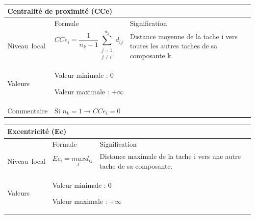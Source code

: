 \documentclass{article}
\begin{document}
\begin{table}[H]
\raggedright
\begin{tabular}{|m{3.24cm}|m{4.4810004cm}m{7.924cm}|}

\hline
\multicolumn{3}{|m{16.044998cm}|}{Centralité de proximité (CCe)}\\\hline
 &
\multicolumn{1}{m{4.4810004cm}|}{Formule} &
Signification\\\hline
Niveau~local 

 &
\multicolumn{1}{m{4.4810004cm}|}{\begin{equation*}
{\mathit{CCe}}_{i}=\frac{1}{{n}_{k}-1}\sum _{\begin{matrix}j=1\\j{\neq}i\end{matrix}}^{{n}_{k}}{{d}_{\mathit{ij}}}
\end{equation*}
} &
Distance moyenne de la tache i vers toutes les autres taches de sa composante k. \\\hline
Valeurs &
\multicolumn{2}{m{12.6050005cm}|}{Valeur minimale : 0

Valeur maximale :  $+{\infty}$

}\\\hline
Commentaire &
\multicolumn{2}{m{12.6050005cm}|}{Si  ${n}_{k}=1\rightarrow {\mathit{CCe}}_{i}=0$ }\\\hline
\end{tabular}
\end{table}
\begin{table}[H]
\raggedright
\begin{tabular}{|m{3.24cm}|m{4.4810004cm}m{7.924cm}|}

\hline
\multicolumn{3}{|m{16.044998cm}|}{Excentricité (Ec)}\\\hline
 &
\multicolumn{1}{m{4.4810004cm}|}{Formule} &
Signification\\\hline
Niveau~local 

 &
\multicolumn{1}{m{4.4810004cm}|}{\begin{equation*}
{\mathit{Ec}}_{i}=\underset{j}{\mathit{max}}{d}_{\mathit{ij}}
\end{equation*}
} &
Distance maximale de la tache i vers une autre tache de sa composante. \\\hline
Valeurs &
\multicolumn{2}{m{12.6050005cm}|}{Valeur minimale : 0

Valeur maximale :  $+{\infty}$

}\\\hline
\end{tabular}
\end{table}
\end{document}
